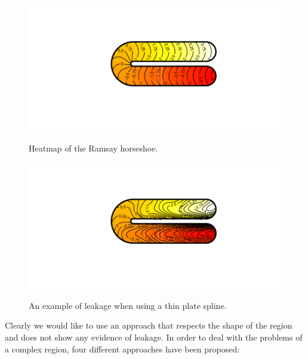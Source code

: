 \documentclass[a4paper,10pt]{amsart}
\begin{document}
\begin{figure}
\centering
\includegraphics[trim=0.5in 1in 0in 1in]{figs/ramsayhorseshoe.pdf} \\
\caption{Heatmap of the Ramsay horseshoe.}
\label{ramsayshorseshoe}
\end{figure}

\begin{figure}
\centering
\includegraphics[trim=0.5in 1in 0in 1in]{figs/leakageexample.pdf} \\
\caption{An example of leakage when using a thin plate spline.}
\label{tpleakage}
\end{figure}

Clearly we would like to use an approach that respects the shape of the region and does not show any evidence of leakage. In order to deal with the problems of a complex region, four different approaches have been proposed:
\end{document}

